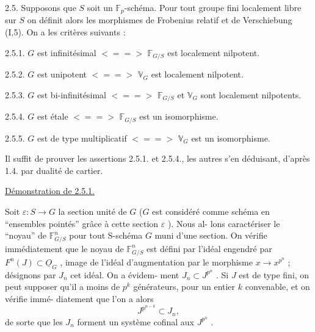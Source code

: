 
2.5. \quad Supposons que $S$ soit un $\mathbb{F}_p$-schéma. Pour tout groupe fini
localement libre sur $S$ on définit alors les morphismes de Frobenius
relatif et de Verschiebung (I,5). On a les critères suivants :

2.5.1. \quad $G$ est infinitésimal $<==>$ $\mathbb{F}_{G/S}$ est localement nilpotent.

2.5.2. \quad $G$ est unipotent $<==>$ $\mathbb{V}_G$ est localement nilpotent.

2.5.3. \quad $G$ est bi-infinitésimal $<==>$ $\mathbb{F}_{G/S}$ et $\mathbb{V}_G$ sont localement
nilpotents.

2.5.4. \quad $G$ est étale $<==>$ $\mathbb{F}_{G/S}$ est un isomorphisme.

2.5.5. \quad $G$ est de type multiplicatif $<==>$ $\mathbb{V}_G$ est un isomorphisme.

Il suffit de prouver les assertions 2.5.1. et 2.5.4., les
autres s'en déduisant, d'après 1.4. par dualité de cartier.

\uline{Démonstration de 2.5.1.}

Soit $\varepsilon : S \to G$ la section unité de $G$ ($G$ est considéré
comme schéma en ``ensembles pointés'' grâce à cette section $\varepsilon$ ). Nous al-%
 lons caractériser le ``noyau'' de $\mathbb{F}^n_{G/S}$ pour tout S-schéma $G$ muni d'une
section. On vérifie immédiatement que le noyau de $\mathbb{F}^n_{G/S}$ est défini par
l'idéal engendré par $F^n(J) \subset \underline{O}_G$ , image de l'idéal d'augmentation
par le morphisme $x \to x^{p^n}$ ; désignons par $J_n$ cet idéal. On a évidem-%
ment $J_n \subset J^{p^n}$ . Si $J$ est de type fini, on peut supposer qu'il a moins
de $p^k$ générateurs, pour un entier $k$ convenable, et on vérifie immé-%
diatement que l'on a alors
\[ J^{p^{n-k}} \subset J_n , \]
de sorte que les $J_n$ forment un système cofinal aux $J^{p^n}$ .

